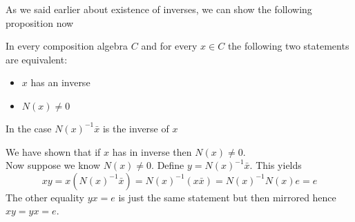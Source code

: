 \documentclass[../Thesis.tex]{subfiles}
\begin{document}
As we said earlier about existence of inverses, we can show the following proposition now
\begin{prop}
In every composition algebra $C$ and for every $x \in C$ the following two statements are equivalent:
\begin{itemize}
\item $x$ has an inverse
\item $N(x) \neq 0$
\end{itemize}
In the case $N(x)^ {-1} \bar{x}$ is the inverse of $x$
\end{prop}
\begin{myproof}
We have shown that if $x$ has in inverse then $N(x) \neq 0$.
\\Now suppose we know $N(x) \neq 0$. Define $y = N(x)^{-1}\bar{x}$. This yields
\begin{equation}
xy = x(N(x)^{-1}\bar{x}) = N(x)^{-1}(x \bar{x}) = N(x)^{-1}N(x) e = e
\end{equation}
The other equality $yx = e$ is just the same statement but then mirrored hence $xy = yx = e$.
\end{myproof}
\end{document}
